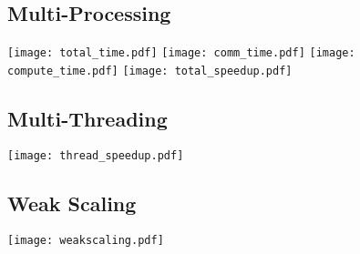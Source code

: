 \subsection*{Multi-Processing}

\texttt{[image: total\_time.pdf]}
\texttt{[image: comm\_time.pdf]}
\texttt{[image: compute\_time.pdf]}
\texttt{[image: total\_speedup.pdf]}

\subsection*{Multi-Threading}
\texttt{[image: thread\_speedup.pdf]}

\subsection*{Weak Scaling}
\texttt{[image: weakscaling.pdf]}
